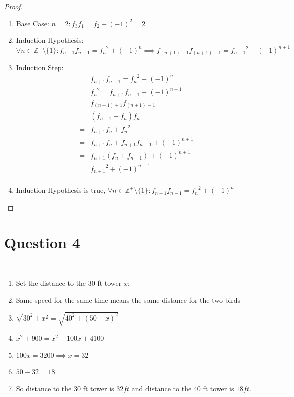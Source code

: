 \documentclass{article}
\begin{document}
\begin{proof}
    \begin{enumerate}
        \item Base Case: $n=2: f_3f_1=f_2+(-1)^2=2$
        \item Induction Hypothesis: $\forall n\in \mathbb{Z^+}\setminus\{1\}:f_{n+1}f_{n-1}={f_n}^2+(-1)^n\implies f_{(n+1)+1}f_{(n+1)-1}={f_{n+1}}^2+(-1)^{n+1}$
        \item Induction Step:
        \begin{align*}
            &f_{n+1}f_{n-1}={f_n}^2+(-1)^n\\
            &{f_n}^2=f_{n+1}f_{n-1}+(-1)^{n+1}\\
            &f_{(n+1)+1}f_{(n+1)-1}\\
            =&(f_{n+1}+f_n)f_n\\
            =&f_{n+1}f_{n}+{f_n}^2\\
            =&f_{n+1}f_{n}+f_{n+1}f_{n-1}+(-1)^{n+1}\\
            =&f_{n+1}(f_{n}+f_{n-1})+(-1)^{n+1}\\
            =&{f_{n+1}}^2+(-1)^{n+1}\\
        \end{align*}
        \item Induction Hypothesis is true, $\forall n\in \mathbb{Z^+}\setminus\{1\}:f_{n+1}f_{n-1}={f_n}^2+(-1)^n$
    \end{enumerate}
\end{proof}

\newpage

\section*{Question 4}

~

\begin{enumerate}
    \item Set the distance to the 30 ft tower $x$;
    \item Same speed for the same time means the same distance for the two birds
    \item $\sqrt{30^2+x^2}=\sqrt{40^2+(50-x)^2}$
    \item $x^2+900=x^2-100x+4100$
    \item $100x=3200\implies x=32$
    \item $50-32=18$
    \item So distance to the 30 ft tower is $\boxed{32 ft}$ and distance to the 40 ft tower is $\boxed{18 ft}$.
\end{enumerate}
\end{document}
